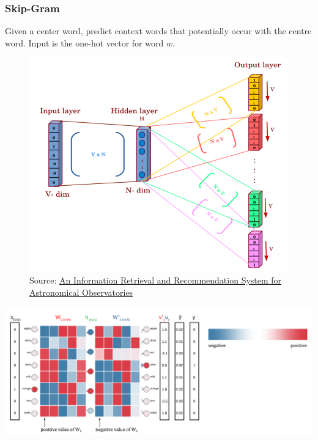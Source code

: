 \documentclass[11pt]{article}
\begin{document}
\subsubsection{Skip-Gram}
\begin{minipage}{0.55\linewidth}
	Given a center word, predict context words that potentially occur with 	the centre word. Input is the one-hot vector for word $w$.
	\vspace{10em}
\end{minipage}
\begin{minipage}{0.4\linewidth}
\begin{figure}[H]
	\centering
	\includegraphics[width=0.9\linewidth]{img/word2vec_skip-gram}
	\caption{Source: \href{https://inspirehep.net/literature/1630982}{An Information Retrieval and Recommendation System for Astronomical Observatories}}
	\label{fig:word2vecskip-gram}
\end{figure}
\end{minipage}
\begin{center}
	\includegraphics[width=0.9\linewidth]{img/word2vec_example}
\end{center}
\end{document}

